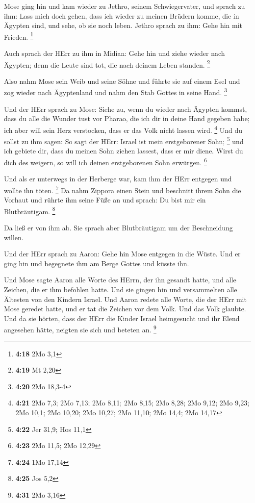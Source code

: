  Mose ging hin und kam wieder zu Jethro, seinem
Schwiegervater, und sprach zu ihm: Lass mich doch gehen, dass ich wieder
zu meinen Brüdern komme, die in Ägypten sind, und sehe, ob sie noch
leben. Jethro sprach zu ihm: Gehe hin mit Frieden. \footnote{\textbf{4:18}
  2Mo 3,1}

 Auch sprach der HErr zu ihm in Midian: Gehe hin und ziehe
wieder nach Ägypten; denn die Leute sind tot, die nach deinem Leben
standen. \footnote{\textbf{4:19} Mt 2,20}

 Also nahm Mose sein Weib und seine Söhne und führte sie
auf einem Esel und zog wieder nach Ägyptenland und nahm den Stab Gottes
in seine Hand. \footnote{\textbf{4:20} 2Mo 18,3-4}

 Und der HErr sprach zu Mose: Siehe zu, wenn du wieder nach
Ägypten kommst, dass du alle die Wunder tust vor Pharao, die ich dir in
deine Hand gegeben habe; ich aber will sein Herz verstocken, dass er das
Volk nicht lassen wird. \footnote{\textbf{4:21} 2Mo 7,3; 2Mo 7,13; 2Mo
  8,11; 2Mo 8,15; 2Mo 8,28; 2Mo 9,12; 2Mo 9,23; 2Mo 10,1; 2Mo 10,20; 2Mo
  10,27; 2Mo 11,10; 2Mo 14,4; 2Mo 14,17}  Und du sollst zu
ihm sagen: So sagt der HErr: Israel ist mein erstgeborener Sohn;
\footnote{\textbf{4:22} Jer 31,9; Hos 11,1}  und ich
gebiete dir, dass du meinen Sohn ziehen lassest, dass er mir diene.
Wirst du dich des weigern, so will ich deinen erstgeborenen Sohn
erwürgen. \footnote{\textbf{4:23} 2Mo 11,5; 2Mo 12,29}

 Und als er unterwegs in der Herberge war, kam ihm der HErr
entgegen und wollte ihn töten. \footnote{\textbf{4:24} 1Mo 17,14}
 Da nahm Zippora einen Stein und beschnitt ihrem Sohn die
Vorhaut und rührte ihm seine Füße an und sprach: Du bist mir ein
Blutbräutigam. \footnote{\textbf{4:25} Jos 5,2}

 Da ließ er von ihm ab. Sie sprach aber Blutbräutigam um
der Beschneidung willen.

 Und der HErr sprach zu Aaron: Gehe hin Mose entgegen in
die Wüste. Und er ging hin und begegnete ihm am Berge Gottes und küsste
ihn.

 Und Mose sagte Aaron alle Worte des HErrn, der ihn gesandt
hatte, und alle Zeichen, die er ihm befohlen hatte.  Und
sie gingen hin und versammelten alle Ältesten von den Kindern Israel.
 Und Aaron redete alle Worte, die der HErr mit Mose geredet
hatte, und er tat die Zeichen vor dem Volk.  Und das Volk
glaubte. Und da sie hörten, dass der HErr die Kinder Israel heimgesucht
und ihr Elend angesehen hätte, neigten sie sich und beteten an.
\footnote{\textbf{4:31} 2Mo 3,16}

